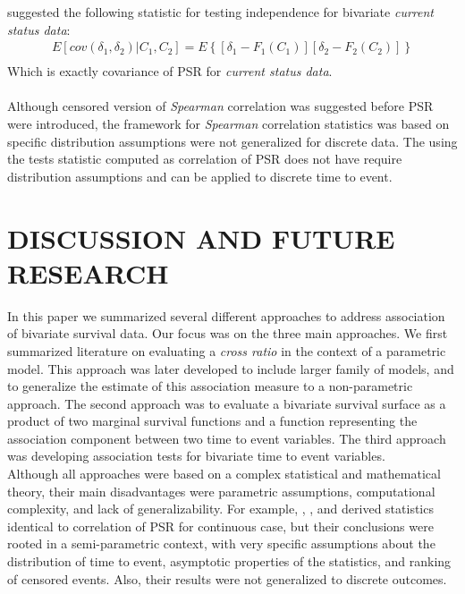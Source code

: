 \documentclass[]{article}
\begin{document}
\cite{ding2004testing} suggested the following statistic for testing independence for bivariate \emph{current status data}:
	$$
	\begin{aligned}
		 E[cov(\delta_1, \delta_2)|C_1,C_2] = E\left\{ [\delta_1 - F_1(C_1)][\delta_2 - F_2(C_2)]  \right\}\\
	\end{aligned}
	$$
Which is exactly covariance of PSR for \emph{current status data}.\\
~\\
Although censored version of \emph{Spearman} correlation was suggested before PSR were introduced, the framework for \emph{Spearman} correlation statistics was based on specific distribution assumptions were not generalized for discrete data. The using the tests statistic computed as correlation of PSR does not have require distribution assumptions and can be applied to discrete time to event.

\section{DISCUSSION AND FUTURE RESEARCH}

In this paper we summarized several different approaches to address association of bivariate survival data. Our focus was on the three main approaches. We first summarized literature on evaluating a \emph{cross ratio} in the context of a parametric model. This approach was later developed to include larger family of models, and to generalize the estimate of this association measure to a non-parametric approach. The second approach was to evaluate a bivariate survival surface as a product of two marginal survival functions and a function representing the association component between two time to event variables. The third approach was developing association tests for bivariate time to event variables.\\

Although all approaches were based on a complex statistical and mathematical theory, their main disadvantages were parametric assumptions, computational complexity, and lack of generalizability. For example, \cite{cuzick1982rank}, \cite{dabrowska1988kaplan}, and \cite{ding2004testing} derived statistics identical to correlation of PSR for continuous case, but their conclusions were rooted in a semi-parametric context, with very specific assumptions about the distribution of time to event, asymptotic properties of the statistics, and ranking of censored events. Also, their results were not generalized to discrete outcomes.\\
\end{document}
